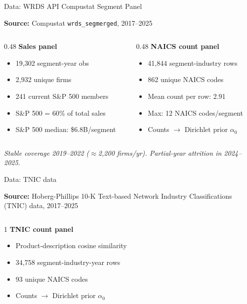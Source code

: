 \documentclass[aspectratio=169]{beamer}
\begin{document}
\begin{frame}{Data: WRDS API Compustat Segment Panel}

  \textbf{Source:} Compustat \texttt{wrds\_segmerged}, 2017--2025

  \vspace{0.8em}

  \begin{columns}[T]
    \begin{column}{0.48\textwidth}
      \textbf{Sales panel}
      \begin{itemize}
        \item 19{,}302 segment-year obs
        \item 2{,}932 unique firms
        \item 241 current S\&P 500 members
        \item S\&P 500 = 60\% of total sales
        \item S\&P 500 median: \$6.8B/segment
      \end{itemize}
    \end{column}
    \begin{column}{0.48\textwidth}
      \textbf{NAICS count panel}
      \begin{itemize}
        \item 41{,}844 segment-industry rows
        \item 862 unique NAICS codes
        \item Mean count per row: 2.91
        \item Max: 12 NAICS codes/segment
        \item Counts $\to$ Dirichlet prior $\alpha_0$
      \end{itemize}
    \end{column}
  \end{columns}

  \vfill
  \small\textit{Stable coverage 2019--2022 ($\approx$2{,}200 firms/yr). Partial-year attrition in 2024--2025.}

\end{frame}

\begin{frame}{Data: TNIC data}

  \textbf{Source:} Hoberg-Phillips 10-K Text-based Network Industry Classifications (TNIC) data, 2017--2025

  \vspace{0.8em}

  \begin{columns}[T]
    \begin{column}{1\textwidth}
      \textbf{TNIC count panel}
      \begin{itemize}
        \item Product-description cosine similarity
        \item 34{,}758 segment-industry-year rows
        \item 93 unique NAICS codes
        \item Counts $\to$ Dirichlet prior $\alpha_0$
      \end{itemize}
    \end{column}
  \end{columns}

\end{frame}
\end{document}
